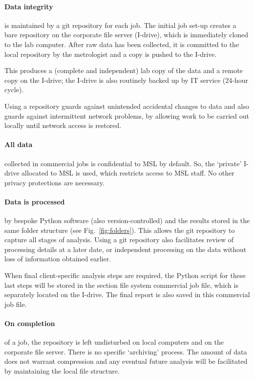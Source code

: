 \paragraph{Data integrity} is maintained by a git repository for each job. The initial job set-up creates a bare repository on the corporate file server (I-drive), which is immediately cloned to the lab computer. After raw data has been collected, it is committed to the local repository by the metrologist and a copy is pushed to the I-drive. 

This produces a (complete and independent) lab copy of the data and a remote copy on the I-drive; the I-drive is also routinely backed up by IT service (24-hour cycle). 

Using a repository guards against unintended accidental changes to data and also guards against intermittent network problems, by allowing work to be carried out locally until network access is restored.

\paragraph{All data} collected in commercial jobs is confidential to MSL by default. So, the `private' I-drive allocated to MSL is used, which restricts access to MSL staff. No other privacy protections are necessary.  

\paragraph{Data is processed} by bespoke Python software (also version-controlled) and the results stored in the same folder structure (see Fig.~\ref{fig:folders}). This allows the git repository to capture all stages of analysis. Using a git repository also facilitates review of processing details at a later date, or independent processing on the data without loss of information obtained earlier. 

When final client-specific analysis steps are required, the Python script for these last steps will be stored in the section file system commercial job file, which is separately located on the I-drive. The final report is also saved in this commercial job file. 

\paragraph{On completion} of a job, the repository is left undisturbed on local computers and on the corporate file server. There is no specific `archiving' process. The amount of data does not warrant compression and any eventual future analysis will be facilitated by maintaining the local file structure. 

